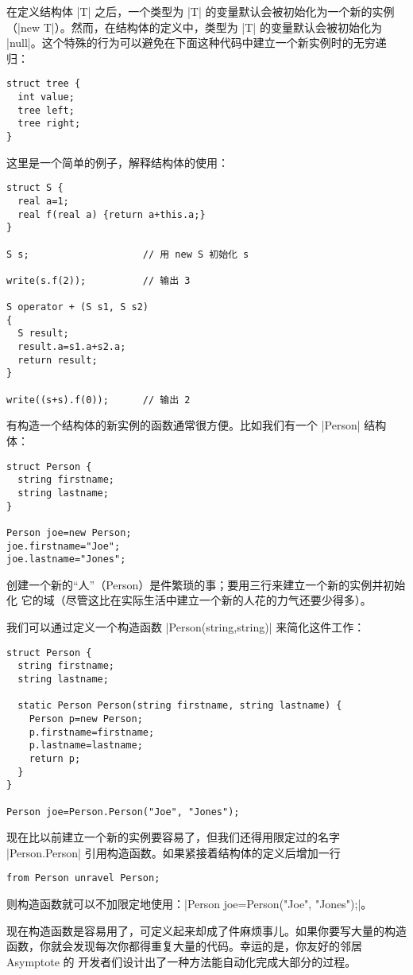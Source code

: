 \documentclass{ctexbook}
\begin{document}
在定义结构体 |T| 之后，一个类型为 |T| 的变量默认会被初始化为一个新的实例
（|new T|）。然而，在结构体的定义中，类型为 |T| 的变量默认会被初始化为
|null|。这个特殊的行为可以避免在下面这种代码中建立一个新实例时的无穷递归：
\begin{lstlisting}
struct tree {
  int value;
  tree left;
  tree right;
}
\end{lstlisting}

这里是一个简单的例子，解释结构体的使用：
\begin{lstlisting}
struct S {
  real a=1;
  real f(real a) {return a+this.a;}
}

S s;                    // 用 new S 初始化 s

write(s.f(2));          // 输出 3

S operator + (S s1, S s2)
{
  S result;
  result.a=s1.a+s2.a;
  return result;
}

write((s+s).f(0));      // 输出 2
\end{lstlisting}

有构造一个结构体的新实例的函数通常很方便。比如我们有一个 |Person| 结构体：
\begin{lstlisting}
struct Person {
  string firstname;
  string lastname;
}

Person joe=new Person;
joe.firstname="Joe";
joe.lastname="Jones";
\end{lstlisting}
创建一个新的“人”（Person）是件繁琐的事；要用三行来建立一个新的实例并初始化
它的域（尽管这比在实际生活中建立一个新的人花的力气还要少得多）。

我们可以通过定义一个构造函数 |Person(string,string)| 来简化这件工作：
\begin{lstlisting}
struct Person {
  string firstname;
  string lastname;

  static Person Person(string firstname, string lastname) {
    Person p=new Person;
    p.firstname=firstname;
    p.lastname=lastname;
    return p;
  }
}

Person joe=Person.Person("Joe", "Jones");
\end{lstlisting}

现在比以前建立一个新的实例要容易了，但我们还得用限定过的名字 |Person.Person|
引用构造函数。如果紧接着结构体的定义后增加一行
\begin{lstlisting}
from Person unravel Person;
\end{lstlisting}
则构造函数就可以不加限定地使用：|Person joe=Person("Joe", "Jones");|。

现在构造函数是容易用了，可定义起来却成了件麻烦事儿。如果你要写大量的构造
函数，你就会发现每次你都得重复大量的代码。幸运的是，你友好的邻居 Asymptote 的
开发者们设计出了一种方法能自动化完成大部分的过程。
\end{document}
